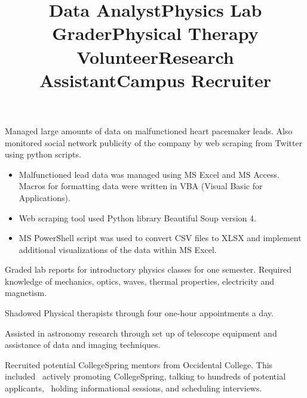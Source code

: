 \documentclass[margin]{res}
\begin{document}
\begin{resume}
\title{\textbf{Data Analyst}}
\begin{position}
	Managed large amounts of data on malfunctioned heart pacemaker leads. Also monitored social network publicity of the company by web scraping from Twitter using python scripts.
	\begin{itemize}
		\item Malfunctioned lead data was managed using MS Excel and MS Access. Macros for formatting data were written in VBA (Visual Basic for Applications).
		\item Web scraping tool used Python library Beautiful Soup version 4.
		\item MS PowerShell script was used to convert CSV files to XLSX and implement additional visualizations of the data within MS Excel.
	\end{itemize}
\end{position}

\title{\textbf{Physics Lab Grader}}
\begin{position}
	Graded lab reports for introductory physics classes for one semester. Required knowledge of mechanics, optics, waves, thermal properties, electricity and magnetism.
\end{position}

\title{\textbf{Physical Therapy Volunteer}}
\begin{position}
	Shadowed Physical therapists through four one-hour appointments a day.
\end{position}

\title{\textbf{Research Assistant}}
\begin{position}
	Assisted in astronomy research through set up of telescope equipment and assistance of data and imaging techniques.
\end{position}

\title{\textbf{Campus Recruiter}}
\begin{position}
	Recruited potential CollegeSpring mentors from Occidental College. This included 
actively promoting CollegeSpring, talking to hundreds of potential applicants, 
holding informational sessions, and scheduling interviews.
\end{position}


\end{resume}
\end{document}
